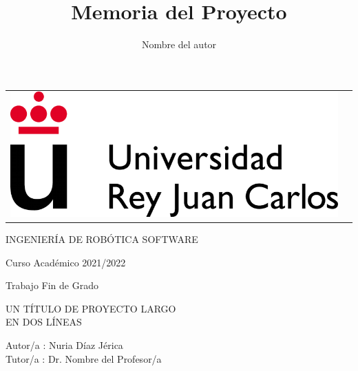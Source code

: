 \documentclass[a4paper, 12pt]{book}
\title{Memoria del Proyecto}
\author{Nombre del autor}
\begin{document}
 


\begin{titlepage}
\begin{center}
\begin{tabular}[c]{c c}
\includegraphics[scale=1.5]{img/LogoURJC.png}
\\
\end{tabular}

\vspace{3cm}

\Large 
INGENIERÍA DE ROBÓTICA SOFTWARE

\vspace{0.4cm}

\large
Curso Académico 2021/2022

\vspace{0.8cm}

Trabajo Fin de Grado

\vspace{2cm}

\LARGE UN TÍTULO DE PROYECTO LARGO\\
EN DOS LÍNEAS
\vspace{3cm}

\large
Autor/a : Nuria Díaz Jérica \\
Tutor/a : Dr. Nombre del Profesor/a
\end{center}
\end{titlepage}
\end{document}
